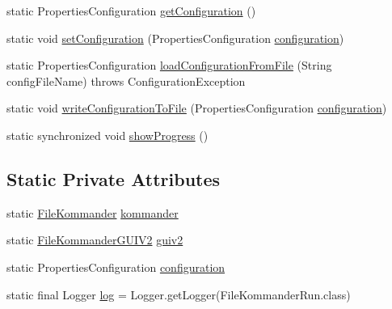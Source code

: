 \begin{DoxyCompactItemize}
\item 
static Properties\-Configuration \hyperlink{classcom_1_1poly_1_1nlp_1_1filekommander_1_1_file_kommander_run_a25c8c598e359f8cde6745af311b48daa}{get\-Configuration} ()
\item 
static void \hyperlink{classcom_1_1poly_1_1nlp_1_1filekommander_1_1_file_kommander_run_a426dc38c43b2cc64b35a3fa5a331a2ba}{set\-Configuration} (Properties\-Configuration \hyperlink{classcom_1_1poly_1_1nlp_1_1filekommander_1_1_file_kommander_run_a6bcf83454309db08057f32fde995ede8}{configuration})
\item 
static Properties\-Configuration \hyperlink{classcom_1_1poly_1_1nlp_1_1filekommander_1_1_file_kommander_run_a459b20955a8772b8de02853c3fae3695}{load\-Configuration\-From\-File} (String config\-File\-Name)  throws Configuration\-Exception 
\item 
static void \hyperlink{classcom_1_1poly_1_1nlp_1_1filekommander_1_1_file_kommander_run_a5e44a48af70a2685c5802345f2089c4c}{write\-Configuration\-To\-File} (Properties\-Configuration \hyperlink{classcom_1_1poly_1_1nlp_1_1filekommander_1_1_file_kommander_run_a6bcf83454309db08057f32fde995ede8}{configuration})
\item 
static synchronized void \hyperlink{classcom_1_1poly_1_1nlp_1_1filekommander_1_1_file_kommander_run_a26e901fd6f8d168583fc6ef90cee71f3}{show\-Progress} ()
\end{DoxyCompactItemize}
\subsection*{Static Private Attributes}
\begin{DoxyCompactItemize}
\item 
static \hyperlink{classcom_1_1poly_1_1nlp_1_1filekommander_1_1_file_kommander}{File\-Kommander} \hyperlink{classcom_1_1poly_1_1nlp_1_1filekommander_1_1_file_kommander_run_a2dffc1b40df78c82faf9567da220dae2}{kommander}
\item 
static \hyperlink{classcom_1_1poly_1_1nlp_1_1filekommander_1_1views_1_1_file_kommander_g_u_i_v2}{File\-Kommander\-G\-U\-I\-V2} \hyperlink{classcom_1_1poly_1_1nlp_1_1filekommander_1_1_file_kommander_run_af105be529e7e9e9312aab57f6381b5ca}{guiv2}
\item 
static Properties\-Configuration \hyperlink{classcom_1_1poly_1_1nlp_1_1filekommander_1_1_file_kommander_run_a6bcf83454309db08057f32fde995ede8}{configuration}
\item 
static final Logger \hyperlink{classcom_1_1poly_1_1nlp_1_1filekommander_1_1_file_kommander_run_ae7643c914a5fa93d155faafc32529519}{log} = Logger.\-get\-Logger(File\-Kommander\-Run.\-class)
\end{DoxyCompactItemize}


